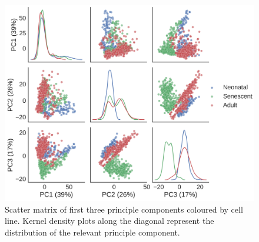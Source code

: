 \documentclass[alpha-refs]{wiley-article}
\begin{document}
\begin{figure}[t]
	\centering
	\includegraphics[width=\textwidth]{img/qc/cell_line}
	\caption{Scatter matrix of first three principle components coloured by cell line. Kernel density plots along the diagonal represent the distribution of the relevant principle component.}
	\label{fig:qc:cell_line}
\end{figure}
\end{document}
